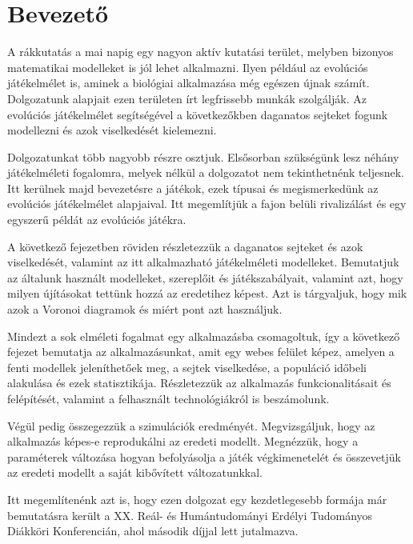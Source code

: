 \chapter{Bevezető}

A rákkutatás a mai napig egy nagyon aktív kutatási terület, melyben bizonyos matematikai modelleket is jól lehet alkalmazni. Ilyen például az evolúciós játékelmélet is, aminek a biológiai alkalmazása még egészen újnak számít. Dolgozatunk alapjait ezen területen írt legfrissebb munkák szolgálják. Az evolúciós játékelmélet segítségével a következőkben daganatos sejteket fogunk  modellezni és azok viselkedését kielemezni.

Dolgozatunkat több nagyobb részre osztjuk. Elsősorban szükségünk lesz néhány játékelméleti fogalomra, melyek nélkül a dolgozatot nem tekinthetnénk teljesnek. Itt kerülnek majd bevezetésre a játékok, ezek típusai és megismerkedünk az evolúciós játékelmélet alapjaival. Itt megemlítjük a fajon belüli rivalizálást és egy egyszerű példát az evolúciós játékra.

A következő fejezetben röviden részletezzük a daganatos sejteket és azok viselkedését, valamint az itt alkalmazható játékelméleti modelleket. Bemutatjuk az általunk használt modelleket, szereplőit és játékszabályait, valamint azt, hogy milyen újításokat tettünk hozzá az eredetihez képest. Azt is tárgyaljuk, hogy mik azok a Voronoi diagramok és miért pont azt használjuk.

Mindezt a sok elméleti fogalmat egy alkalmazásba csomagoltuk, így a következő fejezet bemutatja az alkalmazásunkat, amit egy webes felület képez, amelyen a fenti modellek jeleníthetőek meg, a sejtek viselkedése, a populáció időbeli alakulása és ezek statisztikája. Részletezzük az alkalmazás funkcionalitásait és felépítését, valamint a felhasznált technológiákról is beszámolunk.

Végül pedig összegezzük a szimulációk eredményét. Megvizsgáljuk, hogy az alkalmazás képes-e reprodukálni az eredeti modellt. Megnézzük, hogy a paraméterek változása hogyan befolyásolja a játék végkimenetelét és összevetjük az eredeti modellt a saját kibővített változatunkkal.

Itt megemlítenénk azt is, hogy ezen dolgozat egy kezdetlegesebb formája már bemutatásra került a XX. Reál- és Humántudományi Erdélyi Tudományos Diákköri Konferencián, ahol második díjjal lett jutalmazva.
